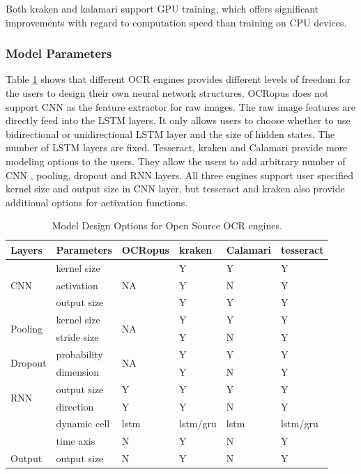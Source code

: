 \documentclass[conference]{IEEEtran}
\begin{document}
Both kraken and kalamari support GPU training, which offers significant improvements with regard to computation speed than training on CPU devices. 

\subsubsection*{Model Parameters}

Table \ref{tab:model_param1} shows that different OCR engines provides different levels of freedom for the users to design their own neural network structures. OCRopus does not support CNN as the feature extractor for raw images. The raw image features are directly feed into the LSTM layers. It only allows users to choose whether to use bidirectional or unidirectional LSTM layer and the size of hidden states. The number of LSTM layers are fixed. Tesseract, kraken and Calamari provide more modeling options to the users. They allow the users to add arbitrary number of CNN , pooling, dropout and RNN layers. All three engines support user specified kernel size and output size in CNN layer, but tesseract and kraken also provide additional options for activation functions. 

\begin{table}[bt]
\begin{tabular}{llllll}
\hline
Layers   &Parameters & OCRopus     & kraken                      & Calamari & tesseract\\ \hline
\multirow{ 3}{*}{CNN} & kernel size & \multirow{ 3}{*}{NA} & Y & Y & Y  \\
& activation &  & Y & N & Y \\
& output size & & Y & Y &  Y\\\hline
\multirow{2}{*}{Pooling} &kernel size & \multirow{2}{*}{NA} &  Y & Y & Y \\
& stride size &  & Y & N & Y \\\hline
\multirow{2}{*}{Dropout} &probability & \multirow{2}{*}{NA} &  Y & Y & Y\\
&dimension &  & Y & N & Y \\\hline
\multirow{2}{*}{RNN} & output size & Y &  Y & Y & Y\\
& direction & Y & Y & N & Y \\
& dynamic cell & lstm & lstm/gru & lstm & lstm/gru\\
& time axis& N & Y & N & Y \\\hline
Output & output size& N & Y & N & Y \\
\end{tabular}
\caption{Model Design Options for Open Source OCR engines.}
\label{tab:model_param1}
\end{table}
\end{document}
